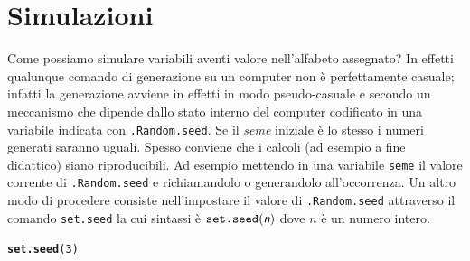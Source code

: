 \documentclass[onecolumn,12pt]{book}\usepackage[]{graphicx}\usepackage[]{color}
\makeatletter
\newcommand{\hlnum}[1]{\textcolor[rgb]{0.686,0.059,0.569}{#1}}%
\newcommand{\hlstd}[1]{\textcolor[rgb]{0.345,0.345,0.345}{#1}}%
\newcommand{\hlkwd}[1]{\textcolor[rgb]{0.737,0.353,0.396}{\textbf{#1}}}%
\newenvironment{kframe}{%
 \def\at@end@of@kframe{}%
 \ifinner\ifhmode%
  \def\at@end@of@kframe{\end{minipage}}%
  \begin{minipage}{\columnwidth}%
 \fi\fi%
 \def\FrameCommand##1{\hskip\@totalleftmargin \hskip-\fboxsep
 \colorbox{shadecolor}{##1}\hskip-\fboxsep
     \hskip-\linewidth \hskip-\@totalleftmargin \hskip\columnwidth}%
 \MakeFramed {\advance\hsize-\width
   \@totalleftmargin\z@ \linewidth\hsize
   \@setminipage}}%
 {\par\unskip\endMakeFramed%
 \at@end@of@kframe}
\newenvironment{knitrout}{}{} %
\newcommand{\varia}[1]{\textsl{\textsf{#1}}}
\makeatother
\begin{document}
  
 
\section{Simulazioni}


Come possiamo simulare variabili aventi valore nell'alfabeto assegnato?
In effetti qualunque comando di generazione su un computer non \`e perfettamente casuale; infatti la generazione avviene in effetti in modo pseudo-casuale e  secondo un meccanismo che dipende dallo stato interno del computer codificato in una variabile indicata con \texttt{.Random.seed}. Se il {\it seme} iniziale \`e lo stesso i numeri generati saranno uguali. Spesso conviene che i calcoli (ad esempio a fine didattico) siano riproducibili. Ad esempio mettendo in una variabile \texttt{seme} il valore corrente di \texttt{.Random.seed} e richiamandolo o generandolo all'occorrenza.  
Un altro modo di procedere consiste nell'impostare il valore di 
\texttt{.Random.seed} attraverso il comando 
\texttt{set.seed}  la cui sintassi \`e 
$\texttt{set.seed}(\varia{n})$ dove $n$ \`e un numero intero.
 
\begin{knitrout}
\color{fgcolor}\begin{kframe}
\begin{alltt}
\hlkwd{set.seed}\hlstd{(}\hlnum{3}\hlstd{)}
\end{alltt}
\end{kframe}
\end{knitrout}
 
\end{document}
